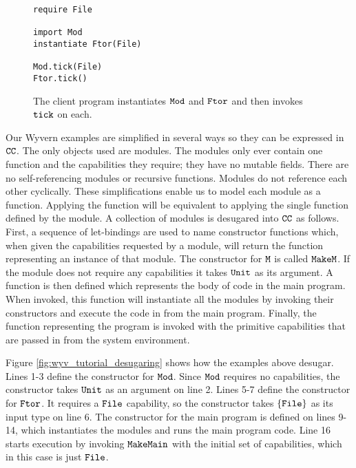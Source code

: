 \begin{figure}[h]

\begin{lstlisting}
require File

import Mod
instantiate Ftor(File)

Mod.tick(File)
Ftor.tick()
\end{lstlisting}

\caption{The client program instantiates $\mathtt{Mod}$ and $\mathtt{Ftor}$ and then invokes $\mathtt{tick}$ on each.}
\label{fig:wyv_module_instantiation}
\end{figure}

Our Wyvern examples are simplified in several ways so they can be expressed in $\mathtt{CC}$. The only objects used are modules. The modules only ever contain one function and the capabilities they require; they have no mutable fields. There are no self-referencing modules or recursive functions. Modules do not reference each other cyclically. These simplifications enable us to model each module as a function. Applying the function will be equivalent to applying the single function defined by the module. A collection of modules is desugared into $\mathtt{CC}$ as follows. First, a sequence of let-bindings are used to name constructor functions which, when given the capabilities requested by a module, will return the function representing an instance of that module. The constructor for $\mathtt{M}$ is called $\mathtt{MakeM}$. If the module does not require any capabilities it takes $\mathtt{Unit}$ as its argument. A function is then defined which represents the body of code in the main program. When invoked, this function will instantiate all the modules by invoking their constructors and execute the code in from the main program. Finally, the function representing the program is invoked with the primitive capabilities that are passed in from the system environment.

Figure \ref{fig:wyv_tutorial_desugaring} shows how the examples above desugar. Lines 1-3 define the constructor for $\mathtt{Mod}$. Since $\mathtt{Mod}$ requires no capabilities, the constructor takes $\mathtt{Unit}$ as an argument on line 2. Lines 5-7 define the constructor for $\mathtt{Ftor}$. It requires a $\mathtt{File}$ capability, so the constructor takes $\mathtt{\{File\}}$ as its input type on line 6. The constructor for the main program is defined on lines 9-14, which instantiates the modules and runs the main program code. Line 16 starts execution by invoking $\mathtt{MakeMain}$ with the initial set of capabilities, which in this case is just $\mathtt{File}$.

